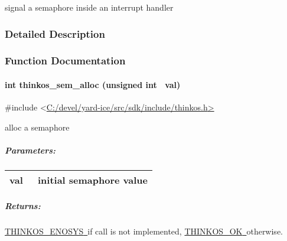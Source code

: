 {{signal a semaphore inside an interrupt handler }

{}

\subsubsection{\texorpdfstring{{Detailed
Description}}{Detailed Description}}\label{detailed-description-4}

{}

{}

\subsubsection{\texorpdfstring{{Function
Documentation}}{Function Documentation}}\label{function-documentation-4}

\paragraph{\texorpdfstring{{int thinkos\_sem\_alloc (unsigned int
~val)}}{int thinkos\_sem\_alloc (unsigned int ~val)}}\label{int-thinkos_sem_alloc-unsigned-int-val}

{}

{\#include
\textless{}}{\protect\hyperlink{h.pkwqa1}{C:/devel/yard-ice/src/sdk/include/thinkos.h}}{\protect\hyperlink{h.pkwqa1}{\textgreater{}}}

{alloc a semaphore }

{}

\subparagraph{\texorpdfstring{{Parameters:}}{Parameters:}}\label{parameters-19}

\protect\hypertarget{t.b02b07ec80924b1785f96fcda4f10f7c9466fa7b}{}{}\protect\hypertarget{t.19}{}{}

\begin{longtable}[]{@{}ll@{}}
\toprule
\begin{minipage}[t]{0.47\columnwidth}\raggedright\strut
{val}{~}\strut
\end{minipage} & \begin{minipage}[t]{0.47\columnwidth}\raggedright\strut
{initial semaphore value }\strut
\end{minipage}\tabularnewline
\bottomrule
\end{longtable}

\subparagraph{\texorpdfstring{{Returns:}}{Returns:}}\label{returns-23}

{\protect\hyperlink{h.3s49zyc}{THINKOS\_ENOSYS}}{\protect\hyperlink{h.3s49zyc}{~}}{if
call is not implemented,
}{\protect\hyperlink{h.2fk6b3p}{THINKOS\_OK}}{\protect\hyperlink{h.2fk6b3p}{~}}{otherwise.
}

}

